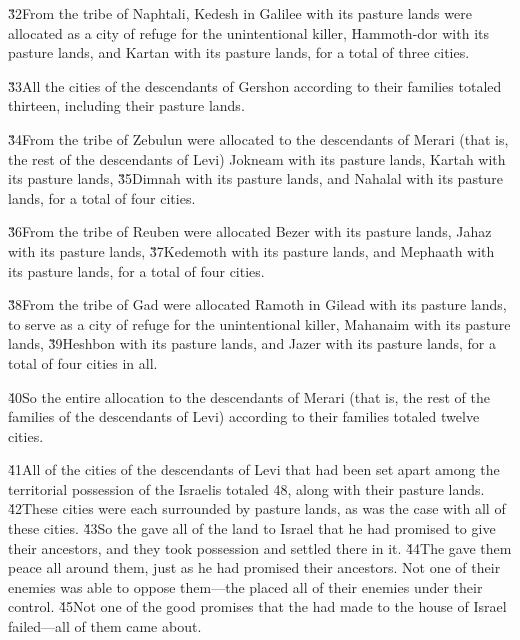 \v{32}From the tribe of Naphtali, Kedesh in Galilee with its pasture lands were allocated as a city of refuge for the unintentional killer, Hammoth-dor with its pasture lands, and Kartan with its pasture lands, for a total of three cities.

\v{33}All the cities of the descendants of Gershon according to their families totaled thirteen, including their pasture lands.

\v{34}From the tribe of Zebulun were allocated to the descendants of Merari (that is, the rest of the descendants of Levi) Jokneam with its pasture lands, Kartah with its pasture lands, \v{35}Dimnah with its pasture lands, and Nahalal with its pasture lands, for a total of four cities.

\v{36}From the tribe of Reuben were allocated Bezer with its pasture lands, Jahaz with its pasture lands, \v{37}Kedemoth with its pasture lands, and Mephaath with its pasture lands, for a total of four cities.

\v{38}From the tribe of Gad were allocated Ramoth in Gilead with its pasture lands, to serve as a city of refuge for the unintentional killer, Mahanaim with its pasture lands, \v{39}Heshbon with its pasture lands, and Jazer with its pasture lands, for a total of four cities in all.

\v{40}So the entire allocation to the descendants of Merari (that is, the rest of the families of the descendants of Levi) according to their families totaled twelve cities.

\v{41}All of the cities of the descendants of Levi that had been set apart among the territorial possession of the Israelis totaled 48, along with their pasture lands. \v{42}These cities were each surrounded by pasture lands, as was the case with all of these cities. \v{43}So the  gave all of the land to Israel that he had promised to give their ancestors, and they took possession and settled there in it. \v{44}The  gave them peace all around them, just as he had promised their ancestors. Not one of their enemies was able to oppose them---the  placed all of their enemies under their control. \v{45}Not one of the good promises that the  had made to the house of Israel failed---all of them came about.

